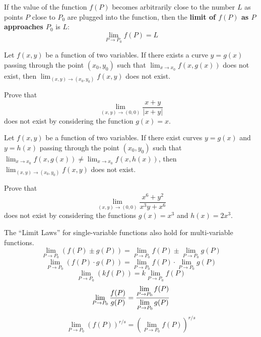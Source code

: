 \documentclass[letterpaper, twoside, 12pt]{book}
\begin{document}
\begin{definition}
  If the value of the function $f(P)$ becomes arbitrarily close to the number
  $L$ as points $P$ close to $P_0$ are plugged into the function, then the
  \textbf{limit of $f(P)$ as $P$ approaches $P_0$} is $L$:
  \[\lim_{P\to P_0} f(P) = L\]
\end{definition}

\begin{theorem}
  Let $f(x,y)$ be a function of two variables.
  If there exists a curve $y=g(x)$ passing through the
  point $(x_0,y_0)$ such that $\lim_{x\to x_0}f(x,g(x))$ does not exist,
  then $\lim_{(x,y)\to(x_0,y_0)}f(x,y)$ does not exist.
\end{theorem}

          \begin{problem}
            Prove that
              \[
                \lim_{(x,y)\to(0,0)} \frac{x+y}{|x+y|}
              \]
            does not exist by considering the function $g(x)=x$.
          \end{problem}

          \begin{solution}

          \end{solution}

\begin{theorem}
  Let $f(x,y)$ be a function of two variables.
  If there exist curves $y=g(x)$ and $y=h(x)$ passing through the
  point $(x_0,y_0)$ such that
  $\lim_{x\to x_0}f(x,g(x))\not=\lim_{x\to x_0}f(x,h(x))$,
  then $\lim_{(x,y)\to(x_0,y_0)}f(x,y)$ does not exist.
\end{theorem}

          \begin{problem}
            Prove that
              \[
                \lim_{(x,y)\to(0,0)} \frac{x^6+y^2}{x^3y+x^6}
              \]
            does not exist by considering the functions
            $g(x)=x^3$ and $h(x)=2x^3$.
          \end{problem}

          \begin{solution}

          \end{solution}

\begin{theorem}
  The ``Limit Laws'' for single-variable functions also hold for
  multi-variable functions.
    \[
      \lim_{P\to P_0}(f(P)\pm g(P))
        =
      \lim_{P\to P_0}f(P) \pm \lim_{P\to P_0}g(P)
    \]
    \[
      \lim_{P\to P_0}(f(P)\cdot g(P))
        =
      \lim_{P\to P_0}f(P) \cdot \lim_{P\to P_0}g(P)
    \]
    \[
      \lim_{P\to P_0}(kf(P))
        =
      k\lim_{P\to P_0}f(P)
    \]
    \[
      \lim_{P\to P_0}\frac{f(P)}{g(P)}
        =
      \frac{\displaystyle \lim_{P\to P_0}f(P)}{\displaystyle \lim_{P\to P_0}g(P)}
    \]
    \[
      \lim_{P\to P_0}(f(P))^{r/s}
        =
      \left(\lim_{P\to P_0}f(P)\right)^{r/s}
    \]
\end{theorem}
\end{document}
